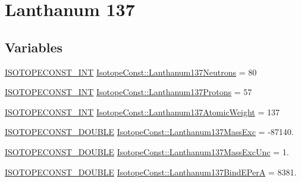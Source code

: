 \hypertarget{group___isotope_const-_lanthanum-_la137}{}\section{Lanthanum 137}
\label{group___isotope_const-_lanthanum-_la137}
\subsection*{Variables}
\begin{DoxyCompactItemize}
\item 
\mbox{\hyperlink{group___isotope_const-_macros_ga5f18360b3e99483a35c32d789e62621c}{I\+S\+O\+T\+O\+P\+E\+C\+O\+N\+S\+T\+\_\+\+I\+NT}} \mbox{\hyperlink{group___isotope_const-_lanthanum-_la137_gad7d78270602f105845ee55f6fe3201f1}{Isotope\+Const\+::\+Lanthanum137\+Neutrons}} = 80
\item 
\mbox{\hyperlink{group___isotope_const-_macros_ga5f18360b3e99483a35c32d789e62621c}{I\+S\+O\+T\+O\+P\+E\+C\+O\+N\+S\+T\+\_\+\+I\+NT}} \mbox{\hyperlink{group___isotope_const-_lanthanum-_la137_ga6617aea23e8ec81c5863be6567709081}{Isotope\+Const\+::\+Lanthanum137\+Protons}} = 57
\item 
\mbox{\hyperlink{group___isotope_const-_macros_ga5f18360b3e99483a35c32d789e62621c}{I\+S\+O\+T\+O\+P\+E\+C\+O\+N\+S\+T\+\_\+\+I\+NT}} \mbox{\hyperlink{group___isotope_const-_lanthanum-_la137_gac1b0eea20711530ec74333a89ebe9e59}{Isotope\+Const\+::\+Lanthanum137\+Atomic\+Weight}} = 137
\item 
\mbox{\hyperlink{group___isotope_const-_macros_ga8f45a7272ce02c0b4c65c44636ed719a}{I\+S\+O\+T\+O\+P\+E\+C\+O\+N\+S\+T\+\_\+\+D\+O\+U\+B\+LE}} \mbox{\hyperlink{group___isotope_const-_lanthanum-_la137_ga7654931bd0a530c4a949a291257f7330}{Isotope\+Const\+::\+Lanthanum137\+Mass\+Exc}} = -\/87140.
\item 
\mbox{\hyperlink{group___isotope_const-_macros_ga8f45a7272ce02c0b4c65c44636ed719a}{I\+S\+O\+T\+O\+P\+E\+C\+O\+N\+S\+T\+\_\+\+D\+O\+U\+B\+LE}} \mbox{\hyperlink{group___isotope_const-_lanthanum-_la137_ga17c0471e174c8b2b3043cc39249e0407}{Isotope\+Const\+::\+Lanthanum137\+Mass\+Exc\+Unc}} = 1.
\item 
\mbox{\hyperlink{group___isotope_const-_macros_ga8f45a7272ce02c0b4c65c44636ed719a}{I\+S\+O\+T\+O\+P\+E\+C\+O\+N\+S\+T\+\_\+\+D\+O\+U\+B\+LE}} \mbox{\hyperlink{group___isotope_const-_lanthanum-_la137_ga8100d8c7ecdde5a628805fec6d5cfaa0}{Isotope\+Const\+::\+Lanthanum137\+Bind\+E\+PerA}} = 8381.
\item 

\end{DoxyCompactItemize}
